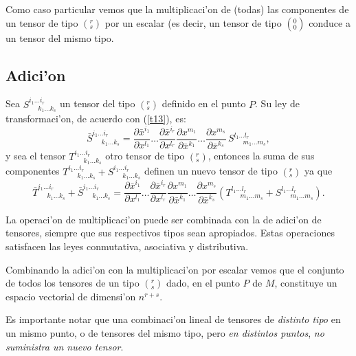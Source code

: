 Como caso particular vemos que la multiplicaci'on de (todas) las componentes de
un tensor de tipo $(^r_s)$ por un escalar (es decir, un tensor de tipo $(^0_0)$ conduce a un tensor del mismo tipo.

\subsection{Adici'on}

Sea $S_{\ \ \ \ \ \ k_1\dots k_{s}}^{i_1\dots i_{r}}$ un tensor del
tipo $(^r_s)$ definido en el punto $P$. Su ley de transformaci'on, de acuerdo
con
(\ref{t13}), es:
\begin{equation}
\bar{S}_{\ \ \ \ \ \ k_1\dots k_{s}}^{i_1\dots
i_{r}}=\frac{\partial\bar{x}^{i_1}
}{\partial x^{l_1}}\dots \frac{\partial\bar{x}^{i_{r}}}{\partial x^{l_{r}}
}\frac{\partial x^{m_1}}{\partial\bar{x}^{k_1}}\dots \frac{\partial x^{m_{s}
}}{\partial\bar{x}^{k_{s}}}\,S_{\ \ \ \ \ \ m_1\dots m_{s}}^{l_1\dots
l_{r}},
\label{ad1}
\end{equation}
y sea el tensor $T_{\ \ \ \ \ \ k_1\dots k_{s}}^{i_1\dots i_{r}}$ otro
tensor de tipo $(^r_s)$, entonces la suma de sus componentes $T_{\ \ \ \ \ \
k_1\dots k_{s}}^{i_1\dots i_{r}}+S_{\ \ \ \ \ \ k_1\dots
k_{s}}^{i_1\dots i_{r}}$ definen un nuevo tensor de tipo $(^r_s)$ ya que
\begin{equation}
\bar{T}_{\ \ \ \ \ \ k_1\dots k_{s}}^{i_1\dots i_{r}}+\bar{S}_{\ \ \ \ \ \
k_1\dots k_{s}}^{i_1\dots i_{r}}=\frac{\partial\bar{x}^{i_1}}{\partial
x^{l_1}}\dots \frac{\partial\bar{x}^{i_{r}}}{\partial x^{l_{r}}}\frac{\partial
x^{m_1}}{\partial\bar{x}^{k_1}}\dots
\frac{\partial x^{m_{s}}}{\partial\bar{x}^{k_{s}}}\left( T_{\ \ \ \ \ \
m_1\dots m_{s}}^{l_1\dots l_{r}}+S_{\ \ \ \ \ \ m_1\dots
m_{s}}^{l_1\dots l_{r}}\right) .\label{ad2}
\end{equation}

La operaci'on de multiplicaci'on puede ser combinada con la de adici'on de tensores, 
siempre que sus respectivos tipos sean apropiados. Estas operaciones satisfacen las leyes conmutativa, asociativa y distributiva.

Combinando la adici'on con la multiplicaci'on por escalar vemos que el conjunto de todos los tensores de un tipo $(^r_s)$ dado, en el punto $P$ de $M$, constituye un espacio vectorial de dimensi'on $n^{r+s}$.

Es importante notar que una combinaci'on lineal de tensores de \textit{distinto
tipo} en un mismo punto, o de tensores del mismo tipo, pero \textit{en distintos puntos},
 \textit{no suministra un nuevo tensor}.


